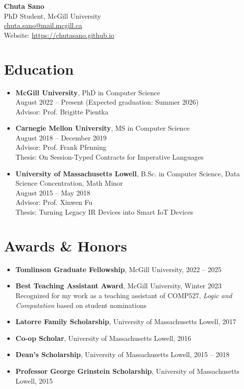 \documentclass[11pt]{article}
\begin{document}
\begin{center}
    {\LARGE \textbf{Chuta Sano}} \\
    PhD Student, McGill University \\
    \href{mailto:chuta.sano@mail.mcgill.ca}{chuta.sano@mail.mcgill.ca} \\
    Website: \href{https://chutasano.github.io}{https://chutasano.github.io}
\end{center}

\section*{Education}
\begin{itemize}[leftmargin=*]
    \item \textbf{McGill University}, PhD in Computer Science \\
    August 2022 – Present (Expected graduation: Summer 2026) \\
    Advisor: Prof. Brigitte Pientka
    \item \textbf{Carnegie Mellon University}, MS in Computer Science \\
    August 2018 – December 2019 \\
    Advisor: Prof. Frank Pfenning \\
    Thesis: On Session-Typed Contracts for Imperative Languages
    \item \textbf{University of Massachusetts Lowell}, B.Sc. in Computer Science, Data Science Concentration, Math Minor \\
    August 2015 – May 2018 \\
    Advisor: Prof. Xinwen Fu \\
    Thesis: Turning Legacy IR Devices into Smart IoT Devices
\end{itemize}

\section*{Awards \& Honors}
\begin{itemize}[leftmargin=*]
    \item \textbf{Tomlinson Graduate Fellowship}, McGill University, 2022 -- 2025
    \item \textbf{Best Teaching Assistant Award}, McGill University, Winter 2023 \\
      Recognized for my work as a teaching assistant of COMP527, \emph{Logic and Computation} based on student nominations
  \item \textbf{Latorre Family Scholarship}, University of Massachusetts Lowell, 2017
  \item \textbf{Co-op Scholar}, University of Massachusetts Lowell, 2016
  \item \textbf{Dean's Scholarship}, University of Massachusetts Lowell, 2015 -- 2018
  \item \textbf{Professor George Grinstein Scholarship}, University of Massachusetts Lowell, 2015
\end{itemize}
\end{document}
